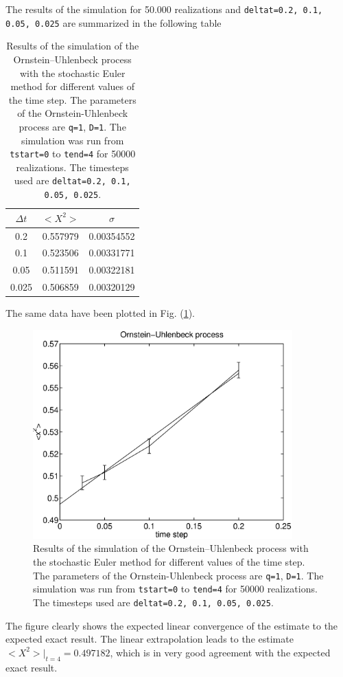 The results of the simulation for 50.000 realizations 
and \texttt{deltat=0.2, 0.1, 0.05, 0.025} are summarized in the following 
table 
\begin{table}
\caption{Results of the simulation of the Ornstein--Uhlenbeck 
process with the stochastic Euler method for different values of 
the time step. The parameters of the Ornstein-Uhlenbeck process
are \texttt{q=1}, \texttt{D=1}. The simulation was run from
\texttt{tstart=0} to \texttt{tend=4} for 50000 realizations.
The timesteps used are \texttt{deltat=0.2, 0.1, 0.05, 0.025}.}
\begin{center}
\begin{tabular}{|c|c|c|} \hline \hline
$\Delta t$ & $<X^2>$ & $\sigma$ \\ \hline \hline
0.2      & 0.557979 & 0.00354552 \\ \hline
0.1      & 0.523506 & 0.00331771  \\ \hline
0.05     & 0.511591 & 0.00322181  \\ \hline
0.025    & 0.506859 & 0.00320129  \\ \hline \hline
\end{tabular}
\end{center}
\end{table}
The same data have been plotted in Fig. (\ref{F_SDEORN_50}).
\begin{figure}
\label{F_SDEORN_50}
\includegraphics[width=10cm]{./Figures/f_sdeorn_50.eps}
\caption{Results of the simulation of the Ornstein--Uhlenbeck 
process with the stochastic Euler method for different values of 
the time step. The parameters of the Ornstein-Uhlenbeck process
are \texttt{q=1}, \texttt{D=1}. The simulation was run from
\texttt{tstart=0} to \texttt{tend=4} for 50000 realizations.
The timesteps used are \texttt{deltat=0.2, 0.1, 0.05, 0.025}.} 
\end{figure}
The figure clearly shows the expected linear convergence of the 
estimate to the expected exact result. The linear extrapolation 
leads to the estimate $<X^2>|_{t=4}=0.497182$, which is in very 
good agreement with the expected exact result. 

